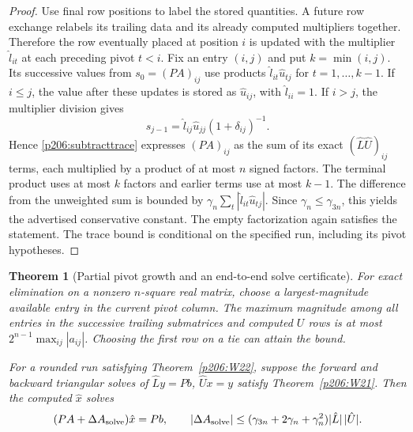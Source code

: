 \documentclass[11pt,oneside,openany]{book}
\theoremstyle{plain}
\newtheorem{theorem}{Theorem}[chapter]
\theoremstyle{definition}
\theoremstyle{remark}
\begin{document}
\begin{proof}
Use final row positions to label the stored quantities.
A future row exchange relabels its trailing data and its already
computed multipliers together. Therefore the row eventually
placed at position \(i\) is updated with the multiplier
\(\hat l_{it}\) at each preceding pivot \(t<i\).
Fix an entry \((i,j)\) and put \(k=\min(i,j)\). Its successive
values from \(s_0=(PA)_{ij}\) use products \(\hat l_{it}\hat u_{tj}\)
for \(t=1,\ldots,k-1\). If \(i\le j\), the value after these updates
is stored as \(\hat u_{ij}\), with \(\hat l_{ii}=1\).
If \(i>j\), the multiplier division gives
\[
       s_{j-1}=\hat l_{ij}\hat u_{jj}(1+\delta_{ij})^{-1}.
\]
Hence \eqref{p206:subtracttrace} expresses \((PA)_{ij}\) as the sum of its exact
\((\hat L\hat U)_{ij}\) terms, each multiplied by a product of
at most \(n\) signed factors. The terminal product uses at most
\(k\) factors and earlier terms use at most \(k-1\).
The difference from the unweighted sum is bounded by
\(\gamma_n\sum_t|\hat l_{it}\hat u_{tj}|\).
Since \(\gamma_n\le\gamma_{3n}\), this yields the advertised
conservative constant. The empty factorization again satisfies
the statement. The trace bound is conditional on the specified
run, including its pivot hypotheses.
\end{proof}

\begin{theorem}[Partial pivot growth and an end-to-end solve certificate]
\label{p206:W23}
For exact elimination on a nonzero \(n\)-square real matrix,
choose a largest-magnitude available entry in the current pivot
column. The maximum magnitude among all entries in the successive
trailing submatrices and computed \(U\) rows is at most
\(2^{n-1}\max_{ij}|a_{ij}|\). Choosing the first row on a tie can
attain the bound.

For a rounded run satisfying Theorem~\ref{p206:W22}, suppose
the forward and backward triangular solves of
\(\hat L y=Pb\), \(\hat Ux=y\) satisfy Theorem~\ref{p206:W21}.
Then the computed \(\hat x\) solves
\[
 (PA+\Delta A_{\rm solve})\hat x=Pb,\qquad
 |\Delta A_{\rm solve}|
   \le(\gamma_{3n}+2\gamma_n+\gamma_n^2)|\hat L|\,|\hat U|.
\]
\end{theorem}
\end{document}
